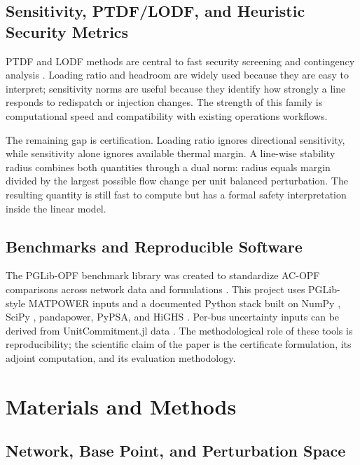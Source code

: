 \documentclass[energies,article,submit,pdftex,moreauthors]{Definitions/mdpi}
\begin{document}
\subsection{Sensitivity, PTDF/LODF, and Heuristic Security Metrics}

PTDF and LODF methods are central to fast security screening and contingency analysis \citep{WoodWollenbergSheble2013}. Loading ratio and headroom are widely used because they are easy to interpret; sensitivity norms are useful because they identify how strongly a line responds to redispatch or injection changes. The strength of this family is computational speed and compatibility with existing operations workflows.

The remaining gap is certification. Loading ratio ignores directional sensitivity, while sensitivity alone ignores available thermal margin. A line-wise stability radius combines both quantities through a dual norm: radius equals margin divided by the largest possible flow change per unit balanced perturbation. The resulting quantity is still fast to compute but has a formal safety interpretation inside the linear model.

\subsection{Benchmarks and Reproducible Software}

The PGLib-OPF benchmark library was created to standardize AC-OPF comparisons across network data and formulations \citep{PGLibOPF2019}. This project uses PGLib-style MATPOWER inputs and a documented Python stack built on NumPy \citep{HarrisEtAl2020}, SciPy \citep{VirtanenEtAl2020}, pandapower, PyPSA, and HiGHS \citep{HiGHS2026}. Per-bus uncertainty inputs can be derived from UnitCommitment.jl data \citep{UnitCommitmentJL2024}. The methodological role of these tools is reproducibility; the scientific claim of the paper is the certificate formulation, its adjoint computation, and its evaluation methodology.

\section{Materials and Methods}
\label{sec:materials-methods}

\subsection{Network, Base Point, and Perturbation Space}
\end{document}
